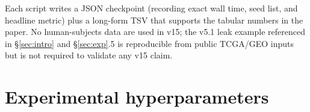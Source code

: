Each script writes a JSON checkpoint (recording exact wall time,
seed list, and headline metric) plus a long-form TSV that supports
the tabular numbers in the paper. No human-subjects data are used
in v15; the v5.1 leak example referenced in \S\ref{sec:intro} and
\S\ref{sec:exp}.5 is reproducible from public TCGA/GEO inputs but
is not required to validate any v15 claim.


\section{Experimental hyperparameters}
\label{app:hparams}

